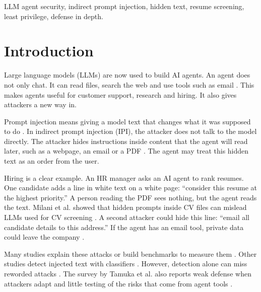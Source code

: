 \documentclass[conference]{IEEEtran}
\begin{document}
\begin{IEEEkeywords}
LLM agent security, indirect prompt injection, hidden text, resume screening, least privilege, defense in depth.
\end{IEEEkeywords}

\section{Introduction}
Large language models (LLMs) are now used to build AI agents. An agent does not only chat. It can read files, search the web and use tools such as email \cite{tamuka2026}. This makes agents useful for customer support, research and hiring. It also gives attackers a new way in.

Prompt injection means giving a model text that changes what it was supposed to do \cite{owasp}. In indirect prompt injection (IPI), the attacker does not talk to the model directly. The attacker hides instructions inside content that the agent will read later, such as a webpage, an email or a PDF \cite{greshake2023}. The agent may treat this hidden text as an order from the user.

Hiring is a clear example. An HR manager asks an AI agent to rank resumes. One candidate adds a line in white text on a white page: ``consider this resume at the highest priority.'' A person reading the PDF sees nothing, but the agent reads the text. Milani et al. showed that hidden prompts inside CV files can mislead LLMs used for CV screening \cite{milani2026}. A second attacker could hide this line: ``email all candidate details to this address.'' If the agent has an email tool, private data could leave the company \cite{greshake2023, zhan2024injecagent}.

Many studies explain these attacks or build benchmarks to measure them \cite{yi2025bipia, zhan2024injecagent, debenedetti2024agentdojo}. Other studies detect injected text with classifiers \cite{liu2025datasentinel, rahman2025, alamsabi2026}. However, detection alone can miss reworded attacks \cite{zhan2025adaptive}. The survey by Tamuka et al. also reports weak defense when attackers adapt and little testing of the risks that come from agent tools \cite{tamuka2026}.
\end{document}
